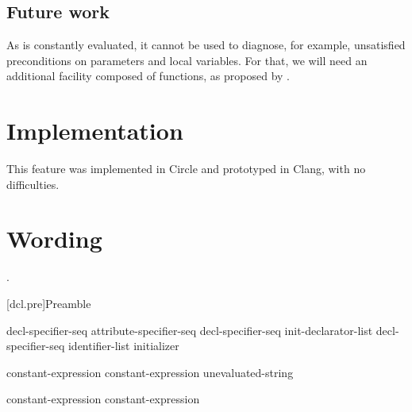 \documentclass{wg21}
\begin{document}
\subsection{Future work}

As  is constantly evaluated, it cannot be used to diagnose, for example, unsatisfied preconditions on parameters and local variables.
For that, we will need an additional facility composed of  functions, as proposed by .

\section{Implementation}

This feature was implemented in Circle and prototyped in Clang, with no difficulties.

\section{Wording}

.



[dcl.pre]{Preamble}

\begin{bnf}
    \br
    decl-specifier-seq  \terminal{;}\br
    attribute-specifier-seq decl-specifier-seq init-declarator-list \terminal{;}\br
     decl-specifier-seq  \terminal{[} identifier-list \terminal{]} initializer \terminal{;}
\end{bnf}

\begin{bnf}
    \br
     \terminal{(} constant-expression \terminal{)} \terminal{;}\br
     \terminal{(} constant-expression \terminal{,} unevaluated-string \terminal{)} \terminal{;}\br
    \begin{addedblock}
     \terminal{(} constant-expression \terminal{,} constant-expression \terminal{)} \terminal{;}
     \end{addedblock}
\end{bnf}
\end{document}

